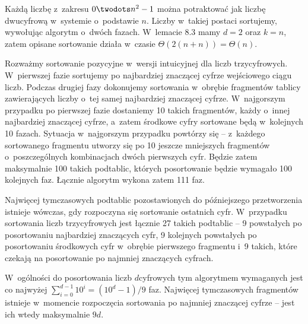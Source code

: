 \exercise %
Każdą liczbę z~zakresu $0\twodots n^2-1$ można potraktować jak liczbę dwucyfrową w~systemie o~podstawie $n$.
Liczby w~takiej postaci sortujemy, wywołując algorytm  o~dwóch fazach.
W~lemacie 8.3 mamy $d=2$ oraz $k=n$, zatem opisane sortowanie działa w~czasie $\Theta(2(n+n))=\Theta(n)$.

\exercise %
Rozważmy sortowanie pozycyjne w~wersji intuicyjnej dla liczb trzycyfrowych.
W~pierwszej fazie sortujemy po najbardziej znaczącej cyfrze wejściowego ciągu liczb.
Podczas drugiej fazy dokonujemy sortowania w~obrębie fragmentów tablicy zawierających liczby o~tej samej najbardziej znaczącej cyfrze.
W~najgorszym przypadku po pierwszej fazie dostaniemy 10 takich fragmentów, każdy o~innej najbardziej znaczącej cyfrze, a~zatem środkowe cyfry sortowane będą w~kolejnych 10 fazach.
Sytuacja w~najgorszym przypadku powtórzy się -- z~każdego sortowanego fragmentu utworzy się po 10 jeszcze mniejszych fragmentów o~poszczególnych kombinacjach dwóch pierwszych cyfr.
Będzie zatem maksymalnie 100 takich podtablic, których posortowanie będzie wymagało 100 kolejnych faz.
Łącznie algorytm wykona zatem 111 faz.

Najwięcej tymczasowych podtablic pozostawionych do późniejszego przetworzenia istnieje wówczas, gdy rozpoczyna się sortowanie ostatnich cyfr.
W~przypadku sortowania liczb trzycyfrowych jest łącznie 27 takich podtablic -- 9 powstałych po posortowaniu najbardziej znaczących cyfr, 9 kolejnych powstałych po posortowaniu środkowych cyfr w~obrębie pierwszego fragmentu i~9 takich, które czekają na posortowanie po najmniej znaczących cyfrach.

W~ogólności do posortowania liczb $d$\nbhyphen cyfrowych tym algorytmem wymaganych jest co najwyżej $\sum_{i=0}^{d-1}10^i=(10^d-1)/9$ faz.
Najwięcej tymczasowych fragmentów istnieje w~momencie rozpoczęcia sortowania po najmniej znaczącej cyfrze -- jest ich wtedy maksymalnie $9d$.
